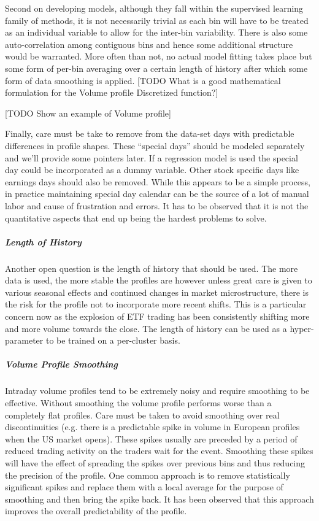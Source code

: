 Second on developing models, although they fall within the supervised learning family of methods, it is not necessarily trivial as each bin will have to be treated as an individual variable to allow for the inter-bin variability. There is also some auto-correlation among contiguous bins and hence some additional structure would be warranted. More often than not, no actual model fitting takes place but some form of per-bin averaging over a certain length of history after which some form of data smoothing is applied.  [TODO What is a good mathematical formulation for the Volume profile Discretized function?]

[TODO Show an example of Volume profile]

Finally, care must be take to remove from the data-set days with predictable differences in profile shapes. These ``special days'' should be modeled separately and we'll provide some pointers later. If a regression model is used the special day could be incorporated as a dummy variable. Other stock specific days like earnings days should also be removed. While this appears to be a simple process, in practice maintaining special day calendar can be the source of a lot of manual labor and cause of frustration and errors. It has to be observed that it is not the quantitative aspects that end up being the hardest problems to solve.


\subparagraph{Length of History}

Another open question is the length of history that should be used. The more data is used, the more stable the profiles are however unless great care is given to various seasonal effects and continued changes in market microstructure, there is the risk for the profile not to incorporate more recent shifts. This is a particular concern now as the explosion of ETF trading has been consistently shifting more and more volume towards the close. The length of history can be used as a hyper-parameter to be trained on a per-cluster basis.


\subparagraph{Volume Profile Smoothing}

Intraday volume profiles tend to be extremely noisy and require smoothing to be effective. Without smoothing the volume profile performs worse than a completely flat profiles. Care must be taken to avoid smoothing over real discontinuities (e.g. there is a predictable spike in volume in European profiles when the US market opens). These spikes usually are preceded by a period of reduced trading activity on the traders wait for the event. Smoothing these spikes will have the effect of spreading the spikes over previous bins and thus reducing the precision of the profile. One common approach is to remove statistically significant spikes and replace them with a local average for the purpose of smoothing and then bring the spike back. It has been observed that this approach improves the overall predictability of the profile. 


